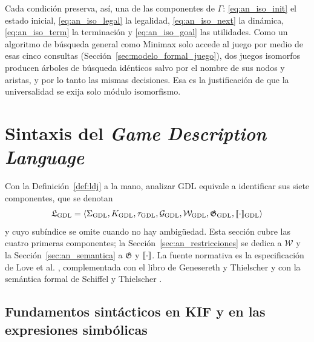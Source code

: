 Cada condición preserva, así, una de las componentes de $\Gamma$: \eqref{eq:an_iso_init} el estado inicial, \eqref{eq:an_iso_legal} la legalidad, \eqref{eq:an_iso_next} la dinámica, \eqref{eq:an_iso_term} la terminación y \eqref{eq:an_iso_goal} las utilidades. Como un algoritmo de búsqueda general como Minimax solo accede al juego por medio de esas cinco consultas (Sección~\ref{sec:modelo_formal_juego}), dos juegos isomorfos producen árboles de búsqueda idénticos salvo por el nombre de sus nodos y aristas, y por lo tanto las mismas decisiones. Esa es la justificación de que la universalidad se exija solo módulo isomorfismo.

\section{Sintaxis del \textit{Game Description Language}}
\label{sec:an_gdl_sintaxis}

Con la Definición~\ref{def:ldj} a la mano, analizar GDL equivale a identificar sus siete componentes, que se denotan
\begin{equation}
    \mathfrak L_{\mathrm{GDL}} = \langle \Sigma_{\mathrm{GDL}}, K_{\mathrm{GDL}}, \tau_{\mathrm{GDL}}, \mathcal G_{\mathrm{GDL}}, \mathcal W_{\mathrm{GDL}}, \mathfrak G_{\mathrm{GDL}}, [\![\cdot]\!]_{\mathrm{GDL}} \rangle
    \label{eq:an_lgdl}
\end{equation}
y cuyo subíndice se omite cuando no hay ambigüedad. Esta sección cubre las cuatro primeras componentes; la Sección~\ref{sec:an_restricciones} se dedica a $\mathcal W$ y la Sección~\ref{sec:an_semantica} a $\mathfrak G$ y $[\![\cdot]\!]$. La fuente normativa es la especificación de Love et al. \cite{Love2008GDL}, complementada con el libro de Genesereth y Thielscher \cite{GeneserethThielscher2014} y con la semántica formal de Schiffel y Thielscher \cite{SchiffelThielscher2010Semantics}.

\subsection{Fundamentos sintácticos en KIF y en las expresiones simbólicas}

